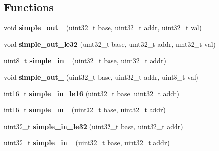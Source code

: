 \subsection*{Functions}
\begin{DoxyCompactItemize}
\item 
\mbox{\label{group__RTEMSBSPsMIPSMalta_ga8afc4bca6d5bac38287bf0b42bd4f18c}} 
void {\bfseries simple\+\_\+out\+\_} (uint32\+\_\+t base, uint32\+\_\+t addr, uint32\+\_\+t val)
\item 
\mbox{\label{group__RTEMSBSPsMIPSMalta_ga5334cff33bbea6eac103fe00b1d0e606}} 
void {\bfseries simple\+\_\+out\+\_\+le32} (uint32\+\_\+t base, uint32\+\_\+t addr, uint32\+\_\+t val)
\item 
\mbox{\label{group__RTEMSBSPsMIPSMalta_ga7dec8c45789ddf8d97c49f502733a316}} 
uint8\+\_\+t {\bfseries simple\+\_\+in\+\_} (uint32\+\_\+t base, uint32\+\_\+t addr)
\item 
\mbox{\label{group__RTEMSBSPsMIPSMalta_ga3168c4a79ef92a3e337a905ccbbc7887}} 
void {\bfseries simple\+\_\+out\+\_} (uint32\+\_\+t base, uint32\+\_\+t addr, uint8\+\_\+t val)
\item 
\mbox{\label{group__RTEMSBSPsMIPSMalta_gac064ec53a54dba7bcaf1def5031318e6}} 
int16\+\_\+t {\bfseries simple\+\_\+in\+\_\+le16} (uint32\+\_\+t base, uint32\+\_\+t addr)
\item 
\mbox{\label{group__RTEMSBSPsMIPSMalta_ga1ed985cc51eb8109b37aacd1d3f0a7a4}} 
int16\+\_\+t {\bfseries simple\+\_\+in\+\_} (uint32\+\_\+t base, uint32\+\_\+t addr)
\item 
\mbox{\label{group__RTEMSBSPsMIPSMalta_ga38837edbb18074bde33455a4511863a2}} 
uint32\+\_\+t {\bfseries simple\+\_\+in\+\_\+le32} (uint32\+\_\+t base, uint32\+\_\+t addr)
\item 
\mbox{\label{group__RTEMSBSPsMIPSMalta_gaa0350225bd7c72e1c32b9a1725050d79}} 
uint32\+\_\+t {\bfseries simple\+\_\+in\+\_} (uint32\+\_\+t base, uint32\+\_\+t addr)
\item 

\end{DoxyCompactItemize}
